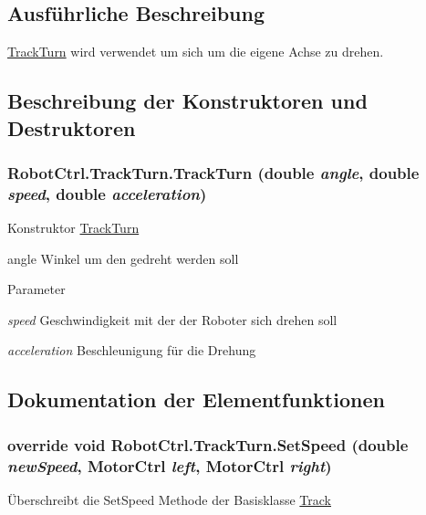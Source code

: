 \subsection{Ausführliche Beschreibung}
\hyperlink{class_robot_ctrl_1_1_track_turn}{TrackTurn} wird verwendet um sich um die eigene Achse zu drehen. 

\subsection{Beschreibung der Konstruktoren und Destruktoren}
\hypertarget{class_robot_ctrl_1_1_track_turn_a734b50f5f72a3521d15855b0f86d2c6c}{
\subsubsection[{TrackTurn}]{\setlength{\rightskip}{0pt plus 5cm}RobotCtrl.TrackTurn.TrackTurn (double {\em angle}, \/  double {\em speed}, \/  double {\em acceleration})}}
\label{class_robot_ctrl_1_1_track_turn_a734b50f5f72a3521d15855b0f86d2c6c}
Konstruktor \hyperlink{class_robot_ctrl_1_1_track_turn}{TrackTurn}

angle Winkel um den gedreht werden soll 
\begin{DoxyParams}{Parameter}
\item[{\em speed}]Geschwindigkeit mit der der Roboter sich drehen soll \item[{\em acceleration}]Beschleunigung f\"{u}r die Drehung \end{DoxyParams}


\subsection{Dokumentation der Elementfunktionen}
\hypertarget{class_robot_ctrl_1_1_track_turn_a065e23cd313e746cb65496c9b9df0955}{
\subsubsection[{SetSpeed}]{\setlength{\rightskip}{0pt plus 5cm}override void RobotCtrl.TrackTurn.SetSpeed (double {\em newSpeed}, \/  {\bf MotorCtrl} {\em left}, \/  {\bf MotorCtrl} {\em right})}}
\label{class_robot_ctrl_1_1_track_turn_a065e23cd313e746cb65496c9b9df0955}
\"{U}berschreibt die SetSpeed Methode der Basisklasse \hyperlink{class_robot_ctrl_1_1_track}{Track}


